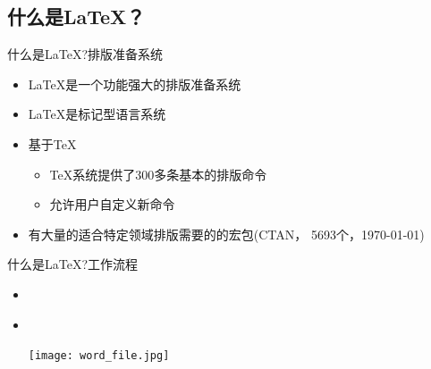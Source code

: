\documentclass[fontset = adobe, xcolor=svgnames, t, aspectratio=169]{ctexbeamer}
\begin{document}
\subsection[是什么？]{什么是\LaTeX ？}\label{sec01-02}
\begin{frame}[t]{什么是\LaTeX?}{排版准备系统}
  \stretchon
  \begin{itemize}
  \item \LaTeX{}是一个功能强大的排版准备系统
  \item \LaTeX{}是标记型语言系统
  \item 基于\TeX
    \begin{itemize}
    \item \TeX{}系统提供了300多条基本的排版命令
    \item 允许用户自定义新命令
    \end{itemize}
  \item 有大量的适合特定领域排版需要的的宏包(CTAN，
    \alert{5693}个，\today )
  \end{itemize}
  \stretchoff
\end{frame}

\begin{frame}[t]{什么是\LaTeX?}{工作流程}
  \begin{itemize}
  \item \wysiwym\\[4ex]
    \begin{center}
    \end{center}
    \vspace{4ex}
  \item \wysiwyg\\[4ex]
    \begin{center}
      \texttt{[image: word\_file.jpg]}
    \end{center}
  \end{itemize}
\end{frame}
\end{document}
